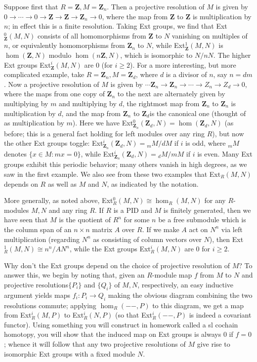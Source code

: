 \documentclass[10pt]{article}
\begin{document}
Suppose first that $R = \mathbf Z, M = \mathbf Z_n$. Then a projective
resolution of $M$ is given by $0\rightarrow\cdots\rightarrow
0\rightarrow\mathbf Z\rightarrow\mathbf Z\rightarrow\mathbf
Z_n\rightarrow 0$, where the map from $\mathbf Z$ to $\mathbf Z$ is
multiplication by $n$; in effect this is a finite resolution. Taking Ext
groups, we find that Ext$_{\mathbf Z}^0(M,N)$ consists of all
homomorphisms from $\mathbf Z$ to $N$ vanishing on multiples of $n$, or
equivalently homomorphisms from $\mathbf Z_n$ to $N$, while
Ext$_{\mathbf Z}^1(M,N)$ is $\hom(\mathbf Z,N)$ modulo $\hom(n\mathbf
Z,N)$, which is isomorphic to $N/nN$. The higher Ext groups
Ext$_{\mathbf Z}^i(M,N)$ are 0 (for $i\ge2$). For a more interesting,
but more complicated example, take $R = \mathbf Z_n, M = \mathbf Z_d$,
where $d$ is a divisor of $n$, say $n=dm$. Now a projective resolution
of $M$ is given by $\cdots\mathbf Z_n\rightarrow\mathbf
Z_n\rightarrow\cdots\rightarrow Z_n\rightarrow Z_d\rightarrow 0$, where
the maps from one copy of $\mathbf Z_n$ to the next are alternately
given by multiplying by $m$ and multiplying by $d$, the rightmost map
from $\mathbf Z_n$ to $\mathbf Z_n$ is multiplication by $d$, and the
map from $\mathbf Z_n$ to $\mathbf Z_d$is the canonical one (thought of
as multiplication by $m$). Here we have Ext$_{\mathbf Z_n}^0(\mathbf
Z_d,N) = \hom(\mathbf Z_d,N)$ (as before; this is a general fact holding
for left modules over any ring $R$), but now the other Ext groups
toggle: Ext$_{\mathbf Z_n}^i(\mathbf Z_d,N) = {}_m M/dM$ if $i$ is odd,
where ${}_m M$ denotes $\{x\in M: mx = 0\}$, while Ext$_{\mathbf
  Z_n}^i(\mathbf Z_d,N) = {}_d M/mM$ if $i$ is even. Many Ext groups
exhibit this periodic behavior; many others vanish in high degrees, as
we saw in the first example. We also see from these two examples that
Ext$_R(M,N)$ depends on $R$ as well as $M$ and $N$, as indicated by the
notation.

More generally, as noted above, Ext$_R^0(M,N)\cong\hom_R(M,N)$ for any
$R$-modules $M,N$ and any ring $R$. If $R$ is a PID and $M$ is finitely
generated, then we have seen that $M$ is the quotient of $R^n$ for some
$n$ be a free submodule which is the column span of an $n\times n$
matrix $A$ over $R$. If we make $A$ act on $N^n$ via left multiplication
(regarding $N^n$ as consisting of column vectors over $N$), then
Ext$_R^1(M,N)\cong n^n/AN^n$, while the Ext groups Ext$_R^i(M,N)$ are 0
for $i\ge2$.

Why don't the Ext groups depend on the choice of projective resolution
of $M$? To answer this, we begin by noting that, given an $R$-module map
$f$ from $M$ to $N$ and projective resolutions$\{P_i\}$ and $\{Q_i\}$ of
$M,N$, respectively, an easy inductive argument yields maps
$f_i:P_i\rightarrow Q_i$ making the obvious diagram combining the two
resolutions commute; applying $\hom_R(--,P)$ to this diagram, we get a
map from Ext$_R^i(M,P)$ to Ext$_R^i(N,P)$ (so that Ext$_R^i(--,P)$ is
indeed a covariant functor). Using something you will construct in
homework called a {sl cochain homotopy}, you will show that the induced
map on Ext groups is always 0 if $f=0$; whence it will follow that any
two projective resolutions of $M$ give rise to isomorphic Ext groups
with a fixed module $N$.
\end{document}
